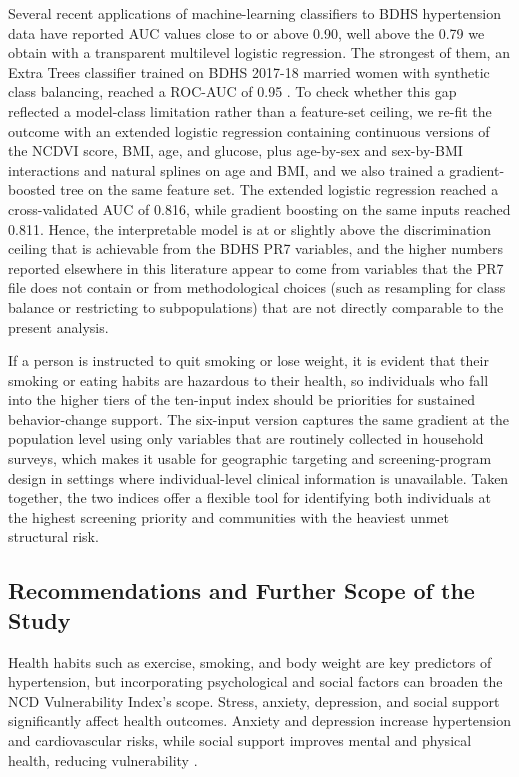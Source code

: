 \documentclass[
  12pt,
  a4paper]{article}
\begin{document}
Several recent applications of machine-learning classifiers to BDHS hypertension data have reported AUC values close to or above 0.90, well above the 0.79 we obtain with a transparent multilevel logistic regression. The strongest of them, an Extra Trees classifier trained on BDHS 2017-18 married women with synthetic class balancing, reached a ROC-AUC of 0.95 \citep{das2025predicting}. To check whether this gap reflected a model-class limitation rather than a feature-set ceiling, we re-fit the outcome with an extended logistic regression containing continuous versions of the NCDVI score, BMI, age, and glucose, plus age-by-sex and sex-by-BMI interactions and natural splines on age and BMI, and we also trained a gradient-boosted tree on the same feature set. The extended logistic regression reached a cross-validated AUC of 0.816, while gradient boosting on the same inputs reached 0.811. Hence, the interpretable model is at or slightly above the discrimination ceiling that is achievable from the BDHS PR7 variables, and the higher numbers reported elsewhere in this literature appear to come from variables that the PR7 file does not contain or from methodological choices (such as resampling for class balance or restricting to subpopulations) that are not directly comparable to the present analysis.

If a person is instructed to quit smoking or lose weight, it is evident that their smoking or eating habits are hazardous to their health, so individuals who fall into the higher tiers of the ten-input index should be priorities for sustained behavior-change support. The six-input version captures the same gradient at the population level using only variables that are routinely collected in household surveys, which makes it usable for geographic targeting and screening-program design in settings where individual-level clinical information is unavailable. Taken together, the two indices offer a flexible tool for identifying both individuals at the highest screening priority and communities with the heaviest unmet structural risk.

\subsection{Recommendations and Further Scope of the Study}\label{recommendations-and-further-scope-of-the-study}

Health habits such as exercise, smoking, and body weight are key predictors of hypertension, but incorporating psychological and social factors can broaden the NCD Vulnerability Index's scope. Stress, anxiety, depression, and social support significantly affect health outcomes. Anxiety and depression increase hypertension and cardiovascular risks, while social support improves mental and physical health, reducing vulnerability \citep{stewart1992measuring, cohen2015state, berkman1984assessing}.
\end{document}
